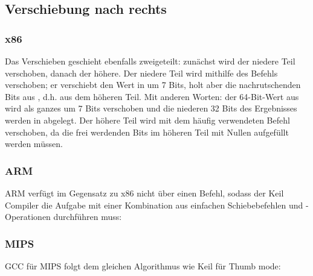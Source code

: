 \subsection{Verschiebung nach rechts}



\subsubsection{x86}





Das Verschieben geschieht ebenfalls zweigeteilt: zunächst wird der niedere Teil verschoben, danach der höhere.
Der niedere Teil wird mithilfe des Befehls  verschoben; er verschiebt den Wert in \EAX um 7 Bits, holt aber
die nachrutschenden Bits aus \EDX, d.h. aus dem höheren Teil.
Mit anderen Worten: der 64-Bit-Wert aus  wird als ganzes um 7 Bits verschoben und die niederen 32 Bits des
Ergebnisses werden in \EAX abgelegt. Der höhere Teil wird mit dem häufig verwendeten \SHR Befehl verschoben, da die frei
werdenden Bits im höheren Teil mit Nullen aufgefüllt werden müssen.

\subsubsection{ARM}
ARM verfügt im Gegensatz zu x86 nicht über einen  Befehl, sodass der Keil Compiler die Aufgabe mit einer
Kombination aus einfachen Schiebebefehlen und \OR-Operationen durchführen muss:





\subsubsection{MIPS}
GCC für MIPS folgt dem gleichen Algorithmus wie Keil für Thumb mode:




